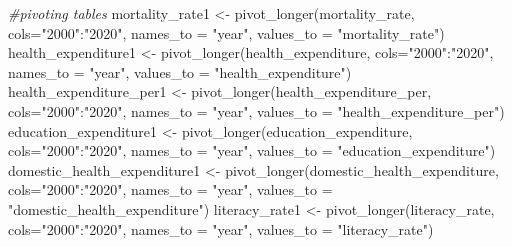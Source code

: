 \documentclass[
]{article}
\newenvironment{Shaded}{\begin{snugshade}}{\end{snugshade}}
\newcommand{\AttributeTok}[1]{\textcolor[rgb]{0.77,0.63,0.00}{#1}}
\newcommand{\CommentTok}[1]{\textcolor[rgb]{0.56,0.35,0.01}{\textit{#1}}}
\newcommand{\FunctionTok}[1]{\textcolor[rgb]{0.00,0.00,0.00}{#1}}
\newcommand{\NormalTok}[1]{#1}
\newcommand{\OtherTok}[1]{\textcolor[rgb]{0.56,0.35,0.01}{#1}}
\newcommand{\SpecialCharTok}[1]{\textcolor[rgb]{0.00,0.00,0.00}{#1}}
\newcommand{\StringTok}[1]{\textcolor[rgb]{0.31,0.60,0.02}{#1}}
\begin{document}
\begin{Shaded}
\begin{Highlighting}[]
\CommentTok{\#pivoting tables}
\NormalTok{mortality\_rate1 }\OtherTok{\textless{}{-}} \FunctionTok{pivot\_longer}\NormalTok{(mortality\_rate, }\AttributeTok{cols=}\StringTok{"2000"}\SpecialCharTok{:}\StringTok{"2020"}\NormalTok{,}
                                 \AttributeTok{names\_to =} \StringTok{"year"}\NormalTok{,}
                                 \AttributeTok{values\_to =} \StringTok{"mortality\_rate"}\NormalTok{)}
\NormalTok{health\_expenditure1 }\OtherTok{\textless{}{-}} \FunctionTok{pivot\_longer}\NormalTok{(health\_expenditure, }\AttributeTok{cols=}\StringTok{"2000"}\SpecialCharTok{:}\StringTok{"2020"}\NormalTok{,}
                                 \AttributeTok{names\_to =} \StringTok{"year"}\NormalTok{,}
                                 \AttributeTok{values\_to =} \StringTok{"health\_expenditure"}\NormalTok{)}
\NormalTok{health\_expenditure\_per1 }\OtherTok{\textless{}{-}} \FunctionTok{pivot\_longer}\NormalTok{(health\_expenditure\_per, }\AttributeTok{cols=}\StringTok{"2000"}\SpecialCharTok{:}\StringTok{"2020"}\NormalTok{,}
                                 \AttributeTok{names\_to =} \StringTok{"year"}\NormalTok{,}
                                 \AttributeTok{values\_to =} \StringTok{"health\_expenditure\_per"}\NormalTok{)}
\NormalTok{education\_expenditure1 }\OtherTok{\textless{}{-}} \FunctionTok{pivot\_longer}\NormalTok{(education\_expenditure, }\AttributeTok{cols=}\StringTok{"2000"}\SpecialCharTok{:}\StringTok{"2020"}\NormalTok{,}
                                 \AttributeTok{names\_to =} \StringTok{"year"}\NormalTok{,}
                                 \AttributeTok{values\_to =} \StringTok{"education\_expenditure"}\NormalTok{)}
\NormalTok{domestic\_health\_expenditure1 }\OtherTok{\textless{}{-}} \FunctionTok{pivot\_longer}\NormalTok{(domestic\_health\_expenditure, }\AttributeTok{cols=}\StringTok{"2000"}\SpecialCharTok{:}\StringTok{"2020"}\NormalTok{,}
                                 \AttributeTok{names\_to =} \StringTok{"year"}\NormalTok{,}
                                 \AttributeTok{values\_to =} \StringTok{"domestic\_health\_expenditure"}\NormalTok{)}
\NormalTok{literacy\_rate1 }\OtherTok{\textless{}{-}} \FunctionTok{pivot\_longer}\NormalTok{(literacy\_rate, }\AttributeTok{cols=}\StringTok{"2000"}\SpecialCharTok{:}\StringTok{"2020"}\NormalTok{,}
                                 \AttributeTok{names\_to =} \StringTok{"year"}\NormalTok{,}
                                 \AttributeTok{values\_to =} \StringTok{"literacy\_rate"}\NormalTok{)}

\end{Highlighting}
\end{Shaded}
\end{document}
